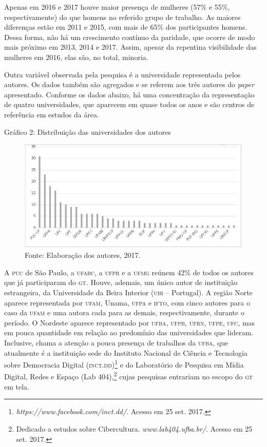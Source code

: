Apenas em 2016 e 2017 houve maior presença de mulheres (57\% e 55\%,
respectivamente) do que homens no referido grupo de trabalho. As maiores
diferenças estão em 2011 e 2015, com mais de 65\% dos participantes
homens. Dessa forma, não há um crescimento contínuo da paridade, que
ocorre de modo mais próximo em 2013, 2014 e 2017. Assim, apesar da
repentina visibilidade das mulheres em 2016, elas são, no total,
minoria.

Outra variável observada pela pesquisa é a universidade representada
pelos autores. Os dados também são agregados e se referem aos
três autores do \emph{paper} apresentado. Conforme os dados abaixo,
há uma concentração da representação de quatro universidades, que
aparecem em quase todos os anos e são centros de referência em estudos
da área.

\begin{center}
Gráfico 2: Distribuição das universidades dos autores
\end{center}

\begin{figure}[!ht]
\centering
 \includegraphics[width=\textwidth]{./imgs/graf3_2.png}
\caption{Fonte: Elaboração dos autores, 2017.}
\end{figure}

A \textsc{puc} de São Paulo, a \textsc{ufabc}, a \textsc{ufpr} e a \textsc{ufmg} reúnem 42\% de todos os
autores que já participaram do \textsc{gt}. Houve, ademais, um único autor de
instituição estrangeira, da Universidade da Beira Interior (\textsc{ubi} --
Portugal). A região Norte aparece representada por \textsc{ufam}, Unama, \textsc{ufpa} e
\textsc{ifto}, com cinco autores para o caso da \textsc{ufam} e uma autora cada para as
demais, respectivamente, durante o período. O Nordeste aparece
representado por \textsc{ufba}, \textsc{ufpb}, \textsc{ufrn}, \textsc{ufpe}, \textsc{ufc}, mas em pouca quantidade em
relação ao predomínio das universidades que lideram. Inclusive, chama a
atenção a pouca presença de trabalhos da \textsc{ufba}, que atualmente é a
instituição sede do Instituto Nacional de Ciência e Tecnologia sobre
Democracia Digital (\textsc{inct}.\textsc{dd})\footnote{\emph{https://www.facebook.com/inct.dd/}.
  Acesso em 25 set. 2017.} e do Laboratório de Pesquisa em Mídia
Digital, Redes e Espaço (Lab 404),\footnote{Dedicado a estudos sobre
  Cibercultura. \emph{www.lab404.ufba.br/}.
  Acesso em 25 set. 2017.} cujas pesquisas entrariam no escopo do \textsc{gt} em
tela.

